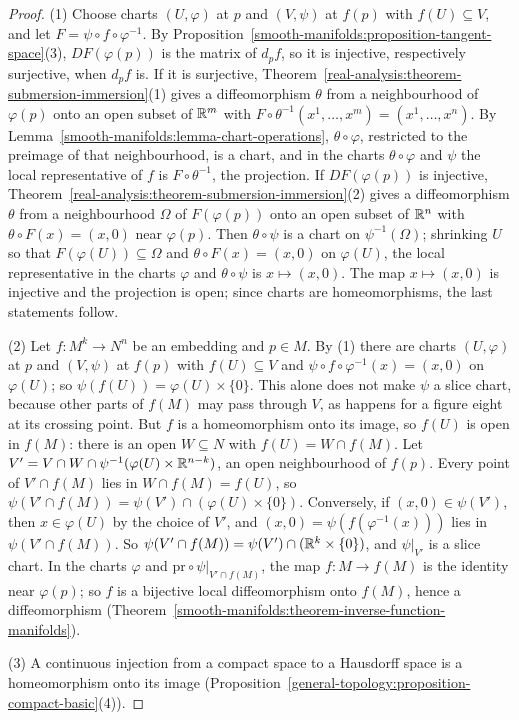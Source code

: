 \begin{proof}
(1) Choose charts $(U, \varphi)$ at $p$ and $(V, \psi)$ at $f(p)$ with $f(U) \subseteq V$, and let $F = \psi \circ f \circ \varphi^{-1}$. By
Proposition~\ref{smooth-manifolds:proposition-tangent-space}(3), $DF(\varphi(p))$ is the matrix of $d_pf$, so it is injective, respectively surjective, when
$d_pf$ is. If it is surjective, Theorem~\ref{real-analysis:theorem-submersion-immersion}(1) gives a diffeomorphism $\theta$ from a neighbourhood of $\varphi(p)$
onto an open subset of $\mathbb{R}^m$ with $F \circ \theta^{-1}(x^1, \ldots, x^m) = (x^1, \ldots, x^n)$. By Lemma~\ref{smooth-manifolds:lemma-chart-operations},
$\theta \circ \varphi$, restricted to the preimage of that neighbourhood, is a chart, and in the charts $\theta \circ \varphi$ and $\psi$ the local
representative of $f$ is $F \circ \theta^{-1}$, the projection. If $DF(\varphi(p))$ is injective, Theorem~\ref{real-analysis:theorem-submersion-immersion}(2)
gives a diffeomorphism $\theta$ from a neighbourhood $\Omega$ of $F(\varphi(p))$ onto an open subset of $\mathbb{R}^n$ with $\theta \circ F(x) = (x, 0)$ near
$\varphi(p)$. Then $\theta \circ \psi$ is a chart on $\psi^{-1}(\Omega)$; shrinking $U$ so that $F(\varphi(U)) \subseteq \Omega$ and $\theta \circ F(x) = (x, 0)$
on $\varphi(U)$, the local representative in the charts $\varphi$ and $\theta \circ \psi$ is $x \mapsto (x, 0)$. The map $x \mapsto (x, 0)$ is injective and the
projection is open; since charts are homeomorphisms, the last statements follow.

(2) Let $f \colon M^k \to N^n$ be an embedding and $p \in M$. By (1) there are charts $(U, \varphi)$ at $p$ and $(V, \psi)$ at $f(p)$ with $f(U) \subseteq V$ and
$\psi \circ f \circ \varphi^{-1}(x) = (x, 0)$ on $\varphi(U)$; so $\psi(f(U)) = \varphi(U) \times \{0\}$. This alone does not make $\psi$ a slice chart, because
other parts of $f(M)$ may pass through $V$, as happens for a figure eight at its crossing point. But $f$ is a homeomorphism onto its
image, so $f(U)$ is open in $f(M)$: there is an open $W \subseteq N$ with $f(U) = W \cap f(M)$. Let
$V' = V \cap W \cap \psi^{-1}(\varphi(U) \times \mathbb{R}^{n-k})$, an open neighbourhood of $f(p)$. Every point of $V' \cap f(M)$ lies in $W \cap f(M) = f(U)$, so
$\psi(V' \cap f(M)) = \psi(V') \cap (\varphi(U) \times \{0\})$. Conversely, if $(x, 0) \in \psi(V')$, then $x \in \varphi(U)$ by the choice of $V'$, and
$(x, 0) = \psi(f(\varphi^{-1}(x)))$ lies in $\psi(V' \cap f(M))$. So $\psi(V' \cap f(M)) = \psi(V') \cap (\mathbb{R}^k \times \{0\})$, and $\psi|_{V'}$ is a slice
chart. In the charts $\varphi$ and $\mathrm{pr} \circ \psi|_{V' \cap f(M)}$, the map $f \colon M \to f(M)$ is the identity near $\varphi(p)$; so $f$ is a bijective
local diffeomorphism onto $f(M)$, hence a diffeomorphism (Theorem~\ref{smooth-manifolds:theorem-inverse-function-manifolds}).

(3) A continuous injection from a compact space to a Hausdorff space is a homeomorphism onto its image
(Proposition~\ref{general-topology:proposition-compact-basic}(4)).
\end{proof}

